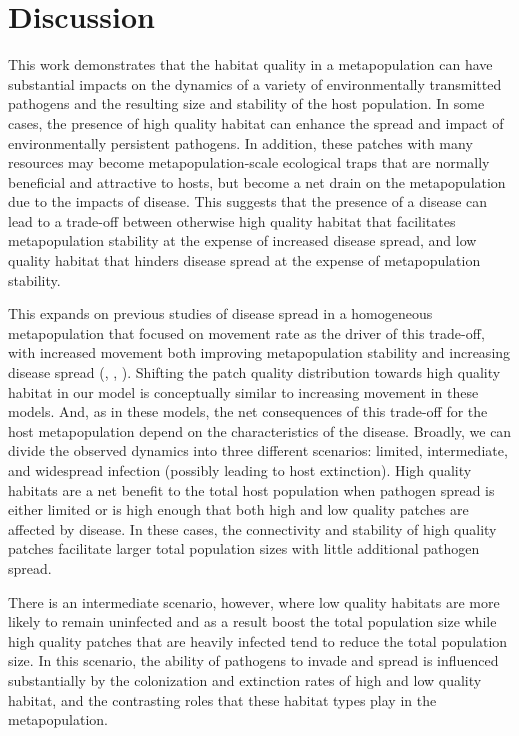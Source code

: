 \documentclass{article}
\begin{document}
\section{Discussion}
\label{discussion} 

This work demonstrates that the habitat quality in a metapopulation can have substantial impacts on the dynamics of a variety of environmentally transmitted pathogens and the resulting size and stability of the host population.
In some cases, the presence of high quality habitat can enhance the spread and impact of environmentally persistent pathogens.  
In addition, these patches with many resources may become metapopulation-scale ecological traps that are normally beneficial and attractive to hosts, but become a net drain on the metapopulation due to the impacts of disease. 
This suggests that the presence of a disease can lead to a trade-off between otherwise high quality habitat that facilitates metapopulation stability at the expense of increased disease spread, and low quality habitat that hinders disease spread at the expense of metapopulation stability.

This expands on previous studies of disease spread in a homogeneous metapopulation that focused on movement rate as the driver of this trade-off, with increased movement both improving metapopulation stability and increasing disease spread (\cite{Hess1996}, \cite{Gog2002}, \cite{Park2012}).  
Shifting the patch quality distribution towards high quality habitat in our model is conceptually similar to increasing movement in these models.
And, as in these models, the net consequences of this trade-off for the host metapopulation depend on the characteristics of the disease.
Broadly, we can divide the observed dynamics into three different scenarios: limited, intermediate, and widespread infection (possibly leading to host extinction). 
High quality habitats are a net benefit to the total host population when pathogen spread is either limited or is high enough that both high and low quality patches are affected by disease. 
In these cases, the connectivity and stability of high quality patches facilitate larger total population sizes with little additional pathogen spread.

There is an intermediate scenario, however, where low quality habitats are more likely to remain uninfected and as a result boost the total population size while high quality patches that are heavily infected tend to reduce the total population size. 
In this scenario, the ability of pathogens to invade and spread is influenced substantially by the colonization and extinction rates of high and low quality habitat, and the contrasting roles that these habitat types play in the metapopulation.
\end{document}
